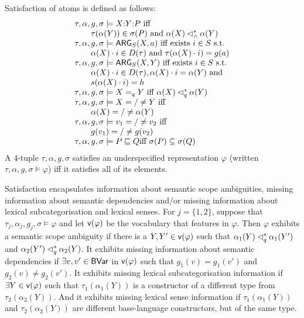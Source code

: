 \begin{definition}\label{defn:satisfaction}
Satisfaction of atoms is defined as follows:
$$
\begin{array}{l}
  \tau, \alpha, g, \sigma \models  X {:} Y {:} P
\mbox{ iff}\\
\qquad \tau(\alpha(Y)) \in \sigma(P) \mbox{ and } \alpha(X) \lhd^*_\wedge
  \alpha(Y) \\
  \tau, \alpha, g, \sigma \models \mathsf{ARG}_S(X,a)
\mbox{ iff exists  $i \in S$ s.t.}\\
\qquad  \alpha(X) \cdot i \in D(\tau) \mbox{ and }
  \tau(\alpha(X) \cdot 
  i) = g(a) \\
  \tau, \alpha, g, \sigma \models \mathsf{ARG}_S(X,Y)
\mbox{ iff  exists $i \in S$ s.t.}\\
\qquad \alpha(X) \cdot i \in D(\tau), \alpha(X) \cdot
  i = \alpha(Y) \mbox{ and }\\
\qquad
s(\alpha(X) \cdot i) = h \\
  \tau, \alpha, g, \sigma \models X =_q Y
\mbox{ iff } \alpha(X) \lhd^*_q \alpha(Y) \\
  \tau, \alpha, g, \sigma \models X ={/}\neq Y
\mbox{ iff } \\
\qquad \alpha(X) ={/}\neq \alpha(Y) \\
  \tau, \alpha, g, \sigma \models v_1 ={/}\neq v_2
\mbox{ iff}\\
\qquad g(v_1) ={/}\neq g(v_2) \\
  \tau, \alpha, g, \sigma \models P \sqsubseteq Q
\mbox{iff $\sigma(P) \subseteq \sigma(Q)$}
\end{array}
$$
A 4-tuple $\tau,\alpha,g,\sigma$ satisfies an underspecified
representation $\varphi$ (written $\tau,\alpha,g,\sigma \models \varphi$)
iff it satisfies all of its
elements.
\end{definition}
Satisfaction encapsulates information about
semantic scope ambiguities, missing
information about 
semantic dependencies and/or missing information about lexical
subcategorisation and lexical senses.   For $j=\{1,2\}$, suppose that
$\tau_j,\alpha_j,g_j,\sigma\models \varphi$ and let $\mathsf{v}(\varphi)$
be the vocabulary that features in $\varphi$.  Then 
$\varphi$ exhibits a semantic scope
ambiguity if there is a $Y,Y'\in \mathsf{v}(\varphi)$ such that $\alpha_1(Y) \lhd^*_q
\alpha_1(Y')$ and $\alpha_2(Y')\lhd^*_q \alpha_2(Y)$.   It exhibits
missing information about semantic dependencies if $\exists v,v'\in
\mathsf{BVar}$ in $\mathsf{v}(\varphi)$ such that $g_1(v)=g_1(v')$ and
$g_2(v)\neq g_2(v')$.  It 
exhibits missing lexical subcategorisation information if $\exists
Y\in \mathsf{v}(\varphi)$ such that $\tau_1(\alpha_1(Y))$ is a constructor of a
different type from $\tau_2(\alpha_2(Y))$.  And it exhibits missing
lexical sense information if $\tau_1(\alpha_1(Y))$ and
$\tau_2(\alpha_2(Y))$ are different base-language constructors, but of
the same type.

